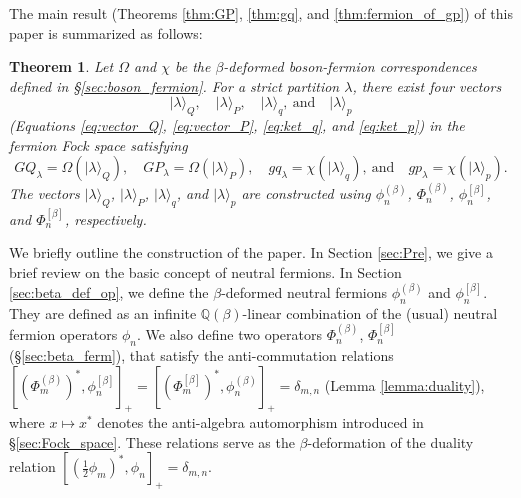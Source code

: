 \documentclass{amsart}
\newtheorem{thm}{Theorem}[section]
\def\QQ{\mathord{\mathbb{Q}}}
\def\ket#1{\vert #1 \rangle}
\begin{document}
The main result (Theorems \ref{thm:GP}, \ref{thm:gq}, and \ref{thm:fermion_of_gp}) of this paper is summarized as follows:
\begin{thm}
Let $\Omega$ and $\chi$ be the $\beta$-deformed boson-fermion correspondences defined in \S \ref{sec:boson_fermion}.
For a strict partition $\lambda$, there exist four vectors
\[
\ket{\lambda}_{Q},\quad \ket{\lambda}_{P},\quad 
\ket{\lambda}_{q},\ \text{and}\quad \ket{\lambda}_p
\]
(Equations \eqref{eq:vector_Q}, \eqref{eq:vector_P}, \eqref{eq:ket_q}, and \eqref{eq:ket_p})
in the fermion Fock space satisfying
\[
GQ_\lambda=\Omega(\ket{\lambda}_Q),\quad
GP_\lambda=\Omega(\ket{\lambda}_P),\quad
gq_\lambda=\chi(\ket{\lambda}_q),\ \text{and}\quad
gp_\lambda=\chi(\ket{\lambda}_p).
\]
The vectors $\ket{\lambda}_{Q}$, $\ket{\lambda}_{P}$, $\ket{\lambda}_{q}$, and $\ket{\lambda}_{p}$ are constructed using $\phi_n^{(\beta)}$, $\Phi_n^{(\beta)}$, $\phi_n^{[\beta]}$, and $\Phi_n^{[\beta]}$, respectively.
\end{thm}


We briefly outline the construction of the paper.
In Section \ref{sec:Pre}, we give a brief review on the basic concept of neutral fermions.
In Section \ref{sec:beta_def_op}, we define the $\beta$-deformed neutral fermions $\phi^{(\beta)}_n$ and $\phi^{[\beta]}_n$. 
They are defined as an infinite $\QQ(\beta)$-linear combination of the (usual) neutral fermion operators $\phi_n$.
We also define two operators $\Phi^{(\beta)}_n$, $\Phi^{[\beta]}_n$ (\S \ref{sec:beta_ferm}), that satisfy the anti-commutation relations $[(\Phi_m^{(\beta)})^\ast,\phi^{[\beta]}_n ]_+=[(\Phi_m^{[\beta]})^\ast,\phi^{(\beta)}_n ]_+=\delta_{m,n}$ (Lemma \ref{lemma:duality}), where $x\mapsto x^\ast$ denotes the anti-algebra automorphism introduced in \S \ref{sec:Fock_space}.
These relations serve as the $\beta$-deformation of the duality relation $[(\tfrac{1}{2}\phi_m)^\ast,\phi_n]_+=\delta_{m,n}$.
\end{document}
